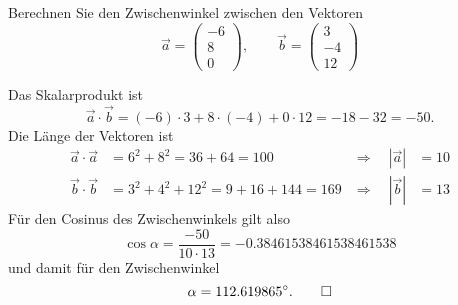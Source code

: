 Berechnen Sie den Zwischenwinkel zwischen den Vektoren
\[
\vec a
=
\begin{pmatrix}-6\\8\\0\end{pmatrix}
,\qquad
\vec b
=
\begin{pmatrix}3\\-4\\12\end{pmatrix}
\]

\begin{loesung}
Das Skalarprodukt ist
\[
\vec a\cdot\vec b=(-6)\cdot 3+8\cdot(-4)+0\cdot 12=-18-32=-50.
\]
Die Länge der Vektoren ist
\begin{align*}
\vec a\cdot\vec a&=6^2+8^2=36+64=100&\Rightarrow\quad|\vec a|&=10\\
\vec b\cdot\vec b&=3^2+4^2+12^2=9+16+144=169&\Rightarrow\quad|\vec b|&=13
\end{align*}
Für den Cosinus des Zwischenwinkels gilt also
\[
\cos \alpha=\frac{-50}{10\cdot 13}=-0.38461538461538461538
\]
und damit für den Zwischenwinkel
\[
\alpha=112.619865^\circ.
\qedhere
\]
\end{loesung}

